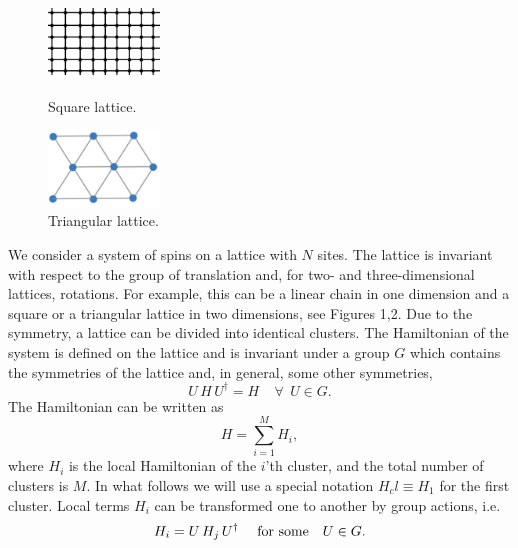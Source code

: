 \documentclass[a4paper]{jpconf}
\renewcommand\[{\begin{equation}}
\renewcommand\]{\end{equation}}
\newcommand{\be}{\begin{equation}}
\newcommand{\ee}{\end{equation}}
\begin{document}
\begin{figure}[t]
	\begin{minipage}{7pc}
		\includegraphics[width=7pc]{sqlattice.png}
	\end{minipage}\hspace{2pc}%
	\begin{minipage}{7pc}
		\caption{\label{label} Square lattice.}
	\end{minipage}\hspace{2pc}%
	\begin{minipage}{7pc}
		\includegraphics[width=7pc]{triangle-lattice.png}
	\end{minipage}\hspace{2pc}%
	\begin{minipage}{7pc}
		\caption{\label{label} Triangular  lattice.}
	\end{minipage}
\end{figure}
We consider a system of spins on a lattice with $N$ sites. The lattice is invariant with respect to the group of translation and, for two- and three-dimensional lattices, rotations. For example, this can be a linear chain in one dimension and a square or a triangular lattice in two dimensions, see Figures 1,2.  Due to the symmetry, a lattice can be divided into identical clusters. The Hamiltonian of the system is defined on the lattice and is invariant under a group $G$ which contains the symmetries of the lattice and, in general, some other symmetries,
\be
U\,H\,U^\dagger =H~~~~~\forall ~~U\in G.
\ee 
The Hamiltonian  can be written as
\be\label{H}
H=\sum_{i=1}^M H_i,
\ee
where $H_i$ is the local Hamiltonian of the $i$'th cluster, and the total number of clusters is $M$. In what follows we will use a special notation $H_cl\equiv H_1$ for the first cluster. Local terms $H_i$ can be transformed one to another by group actions, i.e.
\be\label{Hi}
H_i=U\,H_j\,U^\dagger~~~~{\rm for~ some}~~~U\in G. 
\ee
\end{document}
